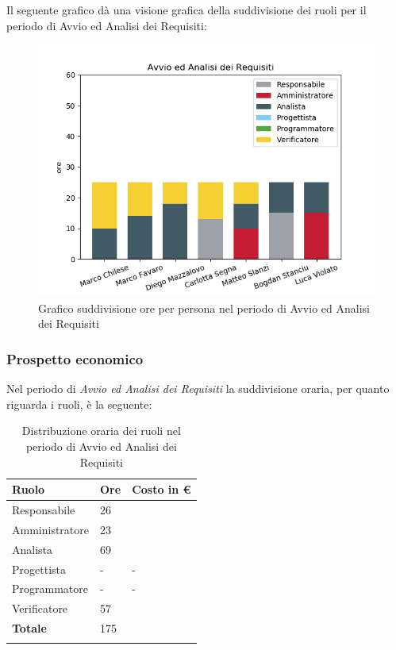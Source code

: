 Il seguente grafico dà una visione grafica della suddivisione dei ruoli per il periodo di Avvio ed Analisi dei Requisiti:

\begin{figure}[H]
	\centering
  		\includegraphics[width=1\linewidth]{./images/fig_aar.png}
  		\caption{Grafico suddivisione ore per persona nel periodo di Avvio ed Analisi dei Requisiti}
  		\label{fig:grafico suddivione ruoli aar}
\end{figure}



\subsubsection{Prospetto economico}
Nel periodo di \textit{Avvio ed Analisi dei Requisiti} la suddivisione oraria, per quanto riguarda i ruoli, è la seguente: 

\begin{longtable}{| C{.30\textwidth}| C{.15\textwidth}| C{.20\textwidth}|}
\hline
\textbf{Ruolo} & \textbf{Ore} & \textbf{Costo in \euro} \\
\hline
Responsabile & 26 &  \\
\hline
Amministratore & 23 &  \\
\hline
Analista & 69 &  \\
\hline
Progettista & - & - \\
\hline
Programmatore & - & - \\
\hline
Verificatore & 57 & \\
\hline
\textbf{Totale} & 175 &  \\
\hline

\caption{Distribuzione oraria dei ruoli nel periodo di Avvio ed Analisi dei Requisiti}
\label{tab: distribuzione oraria aar}
\end{longtable}

